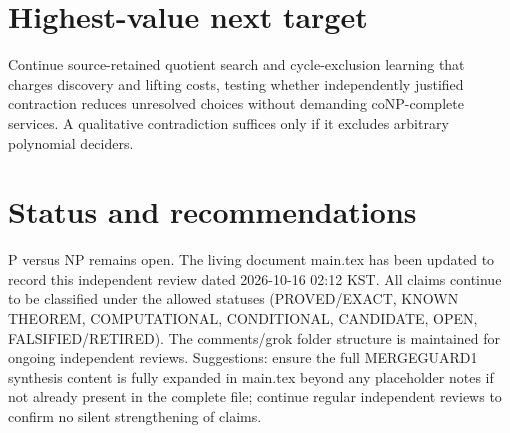 \documentclass[11pt]{article}
\begin{document}
\section{Highest-value next target}
Continue source-retained quotient search and cycle-exclusion learning that charges discovery and lifting costs, testing whether independently justified contraction reduces unresolved choices without demanding coNP-complete services. A qualitative contradiction suffices only if it excludes arbitrary polynomial deciders.

\section{Status and recommendations}
P versus NP remains open. The living document main.tex has been updated to record this independent review dated 2026-10-16 02:12 KST. All claims continue to be classified under the allowed statuses (PROVED/EXACT, KNOWN THEOREM, COMPUTATIONAL, CONDITIONAL, CANDIDATE, OPEN, FALSIFIED/RETIRED). The comments/grok folder structure is maintained for ongoing independent reviews. Suggestions: ensure the full MERGEGUARD1 synthesis content is fully expanded in main.tex beyond any placeholder notes if not already present in the complete file; continue regular independent reviews to confirm no silent strengthening of claims.

\end{document}
